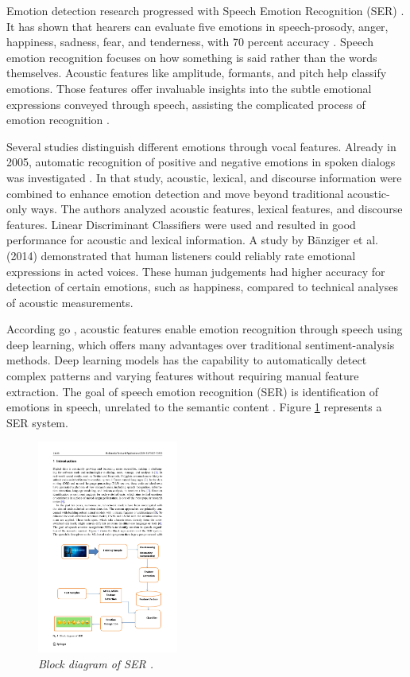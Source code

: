 Emotion detection research progressed with Speech Emotion Recognition (SER) \autocite{Kusal2023}. It has shown that hearers can evaluate five emotions in speech-prosody, anger, happiness, sadness, fear, and tenderness, with 70 percent accuracy \autocite{Oatley2019}. Speech emotion recognition focuses on how something is said rather than the words themselves. Acoustic features like amplitude, formants, and pitch help classify emotions. Those features offer invaluable insights into the subtle emotional expressions conveyed through speech, assisting the complicated process of emotion recognition \autocite{Lian2023}.

Several studies distinguish different emotions through vocal features. Already in 2005, automatic recognition of positive and negative emotions in spoken dialogs was investigated \autocite{ChulMinLee2005}. In that study, acoustic, lexical, and discourse information were combined to enhance emotion detection and move beyond traditional acoustic-only ways. The authors analyzed acoustic features, lexical features, and discourse features. Linear Discriminant Classifiers were used and resulted in good performance for acoustic and lexical information. A study by Bänziger et al. (2014) demonstrated that human listeners could reliably rate emotional expressions in acted voices. These human judgements had higher accuracy for detection of certain emotions, such as happiness, compared to technical analyses of acoustic measurements. 

According go \textcite{Khalil2019}, acoustic features enable emotion recognition through speech using deep learning, which offers many advantages over traditional sentiment-analysis methods. Deep learning models has the capability to automatically detect complex patterns and varying features without requiring manual feature extraction. The goal of speech emotion recognition (SER) is identification of emotions in speech, unrelated to the semantic content \autocite{Kusal2024}. Figure \ref{fig:blockdiagram-SER} represents a SER system.

\begin{figure}[ht]
    \centering
    \includegraphics[height=7cm]{png/background/block-diagram.pdf}
    \caption{\textit{Block diagram of SER \autocite{Tyagi2024}.}}
    \label{fig:blockdiagram-SER}
\end{figure}

